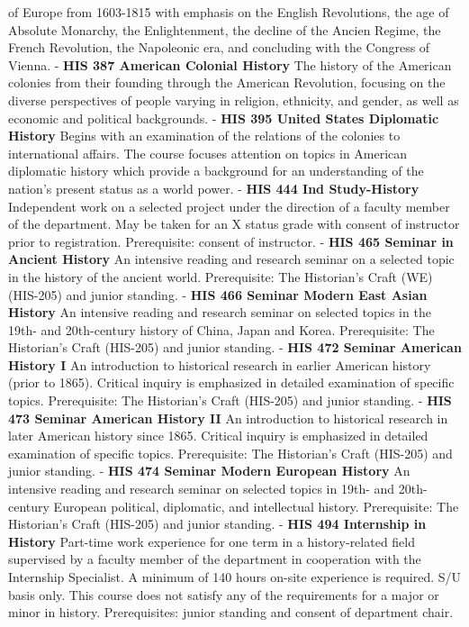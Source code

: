 \documentclass[
  letterpaper,
]{scrbook}
\begin{document}
of Europe from 1603-1815 with emphasis on the English Revolutions, the
age of Absolute Monarchy, the Enlightenment, the decline of the Ancien
Regime, the French Revolution, the Napoleonic era, and concluding with
the Congress of Vienna. - \textbf{HIS 387 American Colonial History} The
history of the American colonies from their founding through the
American Revolution, focusing on the diverse perspectives of people
varying in religion, ethnicity, and gender, as well as economic and
political backgrounds. - \textbf{HIS 395 United States Diplomatic
History} Begins with an examination of the relations of the colonies to
international affairs. The course focuses attention on topics in
American diplomatic history which provide a background for an
understanding of the nation's present status as a world power. -
\textbf{HIS 444 Ind Study-History} Independent work on a selected
project under the direction of a faculty member of the department. May
be taken for an X status grade with consent of instructor prior to
registration. Prerequisite: consent of instructor. - \textbf{HIS 465
Seminar in Ancient History} An intensive reading and research seminar on
a selected topic in the history of the ancient world. Prerequisite: The
Historian's Craft (WE) (HIS-205) and junior standing. - \textbf{HIS 466
Seminar Modern East Asian History} An intensive reading and research
seminar on selected topics in the 19th- and 20th-century history of
China, Japan and Korea. Prerequisite: The Historian's Craft (HIS-205)
and junior standing. - \textbf{HIS 472 Seminar American History I} An
introduction to historical research in earlier American history (prior
to 1865). Critical inquiry is emphasized in detailed examination of
specific topics. Prerequisite: The Historian's Craft (HIS-205) and
junior standing. - \textbf{HIS 473 Seminar American History II} An
introduction to historical research in later American history since
1865. Critical inquiry is emphasized in detailed examination of specific
topics. Prerequisite: The Historian's Craft (HIS-205) and junior
standing. - \textbf{HIS 474 Seminar Modern European History} An
intensive reading and research seminar on selected topics in 19th- and
20th-century European political, diplomatic, and intellectual history.
Prerequisite: The Historian's Craft (HIS-205) and junior standing. -
\textbf{HIS 494 Internship in History} Part-time work experience for one
term in a history-related field supervised by a faculty member of the
department in cooperation with the Internship Specialist. A minimum of
140 hours on-site experience is required. S/U basis only. This course
does not satisfy any of the requirements for a major or minor in
history. Prerequisites: junior standing and consent of department chair.
\end{document}
